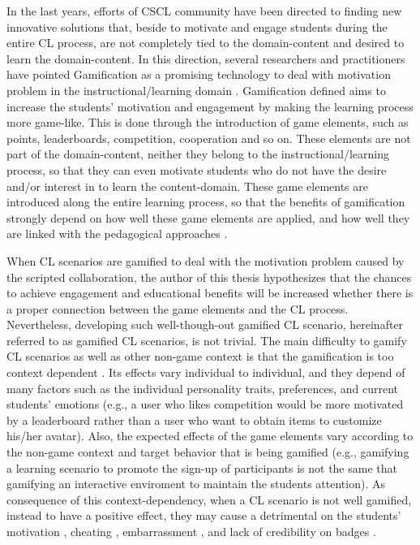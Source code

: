 In the last years, efforts of CSCL community have been directed to finding new innovative solutions that, beside to motivate and engage students during the entire CL process, are not completely tied to the domain-content and desired to learn the domain-content. In this direction, several researchers and practitioners have pointed Gamification as a promising technology to deal with motivation problem in the instructional/learning domain \cite{ChallcoMoreiraMizoguchiIsotani2014, SeabornFels2015, deSousaBorgesDurelliReisIsotani2014}.
Gamification defined  \cite{DeterdingDixonKhaledNacke2011} aims to increase the students' motivation and engagement by making the learning process more game-like. This is done through the introduction of game elements, such as points, leaderboards, competition, cooperation and so on. These elements are not part of the domain-content, neither they belong to the instructional/learning process, so that they can even motivate students who do not have the desire and/or interest in to learn the content-domain. These game elements are introduced along the entire learning process, so that the benefits of gamification strongly depend on how well these game elements are applied, and how well they are linked with the pedagogical approaches \cite{Kapp2012, KnutasIkonenNikulaPorras2014}.

When CL scenarios are gamified to deal with the motivation problem caused by the scripted collaboration, the author of this thesis hypothesizes that the chances to achieve engagement and educational benefits will be increased whether there is a proper connection between the game elements and the CL process. Nevertheless, developing such well-though-out gamified CL scenario, hereinafter referred to as gamified CL scenarios, is not trivial. The main difficulty to gamify CL scenarios as well as other non-game context is that the gamification is too context dependent \cite{HamariKoivistoSarsa2014, RichardsThompsonGraham2014}. Its effects vary individual to individual, and they depend of many factors such as the individual personality traits, preferences, and current students’ emotions \cite{Nicholson2015, PedroLopesPratesVassilevaIsotani2015} (e.g., a user who likes competition would be more motivated by a leaderboard rather than a user who want to obtain items to customize his/her avatar). Also, the expected effects of the game elements vary according to the non-game context and target behavior that is being gamified \cite{DeterdingBjorkNackeDixonLawley2013, HeeterLeeMedlerMagerko2011} (e.g., gamifying a learning scenario to promote the sign-up of participants is not the same that gamifying an interactive enviroment to maintain the students attention). As consequence of this context-dependency, when a CL scenario is not well gamified, instead to have a positive effect, they may cause a detrimental on the students’ motivation \cite{AndradeMizoguchiIsotani2016}, cheating \cite{NunesBittencourtIsotaniJaques2016}, embarrassment \cite{OhnoYamasakiTokiwa2013}, and lack of credibility on badges \cite{DavisSingh2015}.

